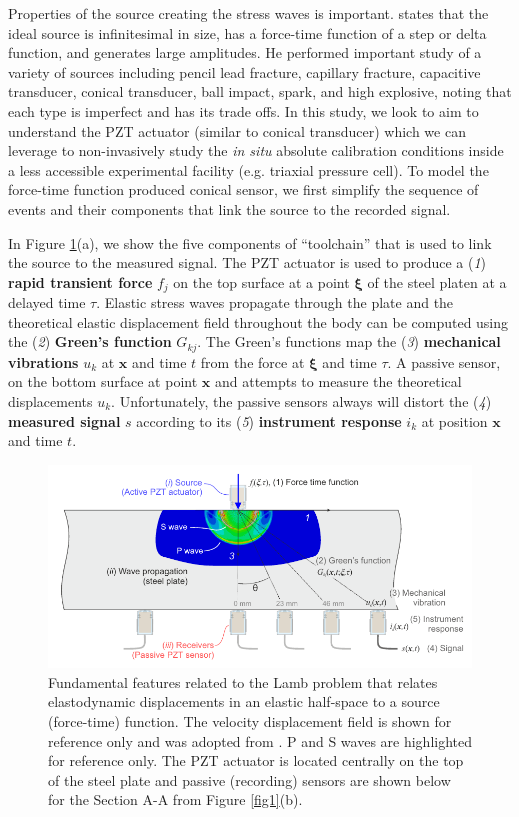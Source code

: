 \documentclass[preprint,3p, 11pt,authoryear]{elsarticle}
\begin{document}
Properties of the source creating the stress waves is important. \citet{Breckenridge1990} states that the ideal source is infinitesimal in size, has a force-time function of a step or delta function, and generates large amplitudes. He performed important study of a variety of sources including pencil lead fracture, capillary fracture, capacitive transducer, conical transducer, ball impact, spark, and high explosive, noting that each type is imperfect and has its trade offs. In this study, we look to aim to understand the PZT actuator (similar to conical transducer) which we can leverage to non-invasively study the \textit{in situ} absolute calibration conditions inside a less accessible experimental facility (e.g. triaxial pressure cell). To model the force-time function produced conical sensor, we first simplify the sequence of events and their components that link the source to the recorded signal.

In Figure \ref{fig2}(a), we show the five components of ``toolchain'' that is used to link the source to the measured signal. The PZT actuator is used to produce a (\textit{1}) \textbf{rapid transient force} $f_{j}$ on the top surface at a point $\mathbf{\xi}$ of the steel platen at a delayed time $\tau$. Elastic stress waves propagate through the plate and the theoretical elastic displacement field throughout the body can be computed using the (\textit{2}) \textbf{Green's function} $G_{kj}$. The Green's functions map the (\textit{3}) \textbf{mechanical vibrations} $u_{k}$ at $\mathbf{x}$ and time $t$ from the force at $\mathbf{\xi}$ and time $\tau$. A passive sensor, on the bottom surface at point $\mathbf{x}$ and attempts to measure the theoretical displacements $u_{k}$. Unfortunately, the passive sensors always will distort the (\textit{4}) \textbf{measured signal}  $s$ according to its (\textit{5}) \textbf{instrument response} $i_{k}$ at position $\mathbf{x}$ and time $t$. 

\begin{figure}[h]
     	\centering
\includegraphics[scale= 1.0]{FIG2.pdf} 
\caption{Fundamental features related to the Lamb problem that relates elastodynamic displacements in an elastic half-space to a source (force-time) function. The velocity displacement field is shown for reference only and was adopted from \citet{Selvadurai2019}. P and S waves are highlighted for reference only. The PZT actuator is located centrally on the top of the steel plate and passive (recording) sensors are shown below for the Section A-A from Figure \ref{fig1}(b).}
	\label{fig2} 
\end{figure}
\end{document}
